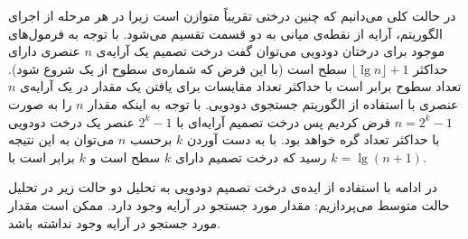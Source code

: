 {در حالت کلی می‌دانیم که چنین درختی تقریباً متوازن است زیرا در هر مرحله از اجرای الگوریتم، آرایه از نقطه‌ی میانی به دو قسمت تقسیم می‌شود. با توجه به فرمول‌های موجود برای درختان دودویی می‌توان گفت درخت تصمیم یک آرایه‌‌ی {$n$} عنصری دارای حداکثر {$\lfloor\lg n \rfloor + 1$} سطح است (با این فرض که شماره‌ی سطوح از یک شروع شود). تعداد سطوح برابر است با حداکثر تعداد مقایسات برای یافتن یک مقدار در یک آرایه‌ی {$n$} عنصری با استفاده از الگوریتم جستجوی دودویی. با توجه به اینکه مقدار {$n$} را به صورت {$n=2^{k}-1$} فرض کردیم پس درخت تصمیم آرایه‌ای با {$2^{k}-1$} عنصر یک درخت دودویی با حداکثر تعداد گره خواهد بود. با به دست آوردن {$k$}  برحسب {$n$}  می‌توان به این نتیجه رسید که درخت تصمیم دارای {$k$} سطح است و {$k$} برابر است با {$k=\lg (n+1)$}. 

در ادامه با استفاده از ایده‌ی درخت‌ تصمیم دودویی به تحلیل دو حالت زیر در تحلیل حالت متوسط می‌پردازیم:
 مقدار مورد جستجو در آرایه وجود دارد.
 ممکن است مقدار مورد جستجو در آرایه وجود نداشته باشد.

}

